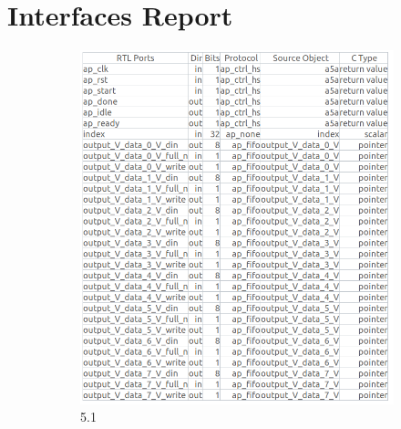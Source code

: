 \documentclass{article}
\begin{document}
\vspace{15cm}


\section{Interfaces Report}
\vspace{1cm}
\begin{figure}[h]
\centering
\begin{subfigure}[b]{0.5\textwidth}
    \centering
\includegraphics[width=\textwidth]{figs/33a.png}
    \caption{5.1}
    \label{fig:my_label}
\end{subfigure}
\hfill
\begin{subfigure}[b]{0.5\textwidth}
    \centering

\end{subfigure}
\end{figure}
\end{document}
